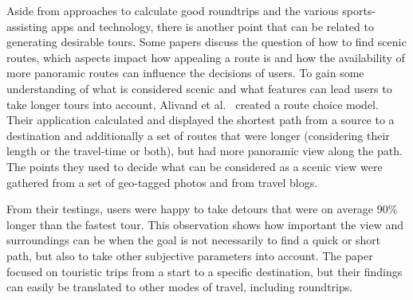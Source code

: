 Aside from approaches to calculate good roundtrips and the various sports-assisting apps and technology, there is another point that can be related to generating desirable tours.
Some papers discuss the question of how to find scenic routes, which aspects impact how appealing a route is and how the availability of more panoramic routes can influence the decisions of users.
To gain some understanding of what is considered scenic and what features can lead users to take longer tours into account, Alivand et al.\ \cite{alivand_analyzing_2015} created a route choice model.
Their application calculated and displayed the shortest path from a source to a destination and additionally a set of routes that were longer (considering their length or the travel-time or both), but had more panoramic view along the path.
The points they used to decide what can be considered as a scenic view were gathered from a set of geo-tagged photos and from travel blogs.

From their testings, users were happy to take detours that were on average 90\% longer than the fastest tour.
This observation shows how important the view and surroundings can be when the goal is not necessarily to find a quick or short path, but also to take other subjective parameters into account.
The paper focused on touristic trips from a start to a specific destination, but their findings can easily be translated to other modes of travel, including roundtrips.


